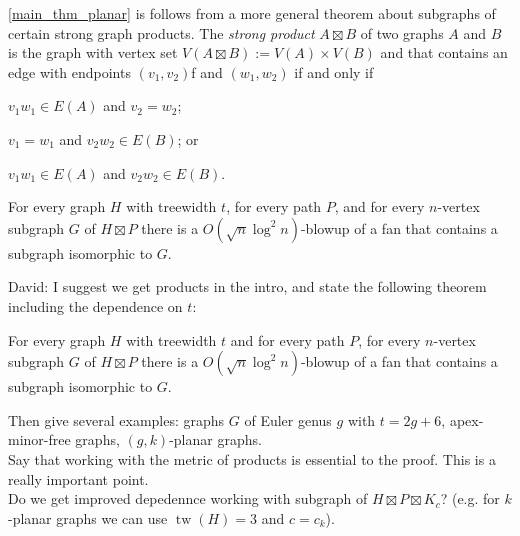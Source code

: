 \documentclass{patmorin}
\newcommand{\david}[1]{{\color{orange} David: #1}}
\newcommand{\defin}[1]{\emph{\textcolor{brightmaroon}{#1}}}
\DeclareMathOperator{\tw}{tw}
\begin{document}
\cref{main_thm_planar} is follows from a more general theorem about subgraphs of certain strong graph products.  The \defin{strong product} $A\boxtimes B$ of two graphs $A$ and $B$ is the graph with vertex set $V(A\boxtimes B):=V(A)\times V(B)$ and that contains an edge with endpoints $(v_1,v_2)$f and $(w_1,w_2)$ if and only if
\begin{compactenum}
    \item $v_1w_1\in E(A)$ and $v_2=w_2$;
    \item $v_1=w_1$ and $v_2w_2\in E(B)$; or
    \item $v_1w_1\in E(A)$ and $v_2w_2\in E(B)$.
\end{compactenum}

\begin{thm}
  For every graph $H$ with treewidth $t$, for every path $P$, and for every $n$-vertex subgraph $G$ of $H\boxtimes P$ there is a $O(\sqrt{n}\log^2 n)$-blowup of a fan that contains a subgraph isomorphic to $G$.
\end{thm}





\david{I suggest we get products in the intro, and state the following theorem including the dependence on $t$:
\begin{thm}
For every graph $H$ with treewidth $t$ and for every path $P$, for every $n$-vertex subgraph $G$ of $H\boxtimes P$ there is a $O(\sqrt{n}\log^2 n)$-blowup of a fan that contains a subgraph isomorphic to $G$.
\end{thm}
Then give several examples: graphs $G$ of Euler genus $g$ with $t=2g+6$, apex-minor-free graphs, $(g,k)$-planar graphs. \\
Say that working with the metric of products is essential to the proof. This is a really important point. \\
Do we get improved depedennce working with subgraph of $H\boxtimes P \boxtimes K_c$? (e.g. for $k$-planar graphs we can use $\tw(H)=3$ and $c=c_k$). 
}
\end{document}
